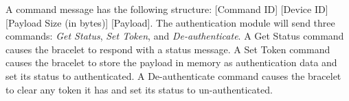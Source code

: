 




A command message has the following structure: [Command ID] [Device ID] [Payload Size (in bytes)] [Payload]. The authentication module will send three commands: \emph{Get Status}, \emph{Set Token}, and \emph{De-authenticate}.  A Get Status command causes the bracelet to respond with a status message. A Set Token command causes the bracelet to store the payload in memory as authentication data and set its status to authenticated.  A De-authenticate command causes the bracelet to clear any token it has and set its status to un-authenticated.

